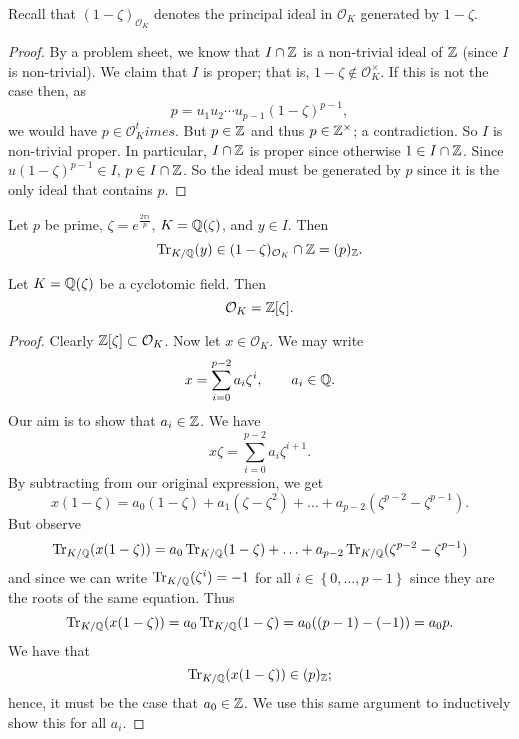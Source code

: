 Recall that $(1 - \zeta)_{\mathcal O_K}$ denotes the principal ideal in 
$\mathcal O_K$ generated by $1 - \zeta$.

\begin{proof}
	By a problem sheet, we know that $I \cap \mathbb{Z}$ is a non-trivial ideal
	of $\mathbb{Z}$ (since $I$ is non-trivial).
	We claim that $I$ is proper;
	that is, $1 - \zeta \not\in \mathcal O_K^\times$.
	If this is not the case then,
	as 
	\[
		p = u_1 u_2 \cdots u_{p-1} \left( 
			1 - \zeta 
		\right)^{p-1},
	\]
	we would have $p \in \mathcal O_K^times$.
	But $p \in \mathbb{Z}$ and thus $p \in \mathbb{Z}^\times$; a contradiction.
	So $I$ is non-trivial proper.
	In particular, $I \cap \mathbb{Z}$ is proper
	since otherwise $1 \in I \cap \mathbb{Z}$.
	Since $u(1 - \zeta)^{p-1} \in I$,
	$p \in I \cap \mathbb{Z}$.
	So the ideal must be generated by $p$ since it is the only ideal
	that contains $p$.
\end{proof}

\begin{theorem}[]
	Let $p$ be prime, $\zeta = e^{\frac{2\pi i}{p}}$,
	$K = \mathbb{Q}(\zeta)$, and $y \in I$.
	Then
	\[
		\operatorname{Tr}_{K/\mathbb{Q}}(y) 
		\in (1-\zeta)_{\mathcal O_K} \cap \mathbb{Z} = (p)_{\mathbb{Z}}.
	\]
\end{theorem}

\begin{theorem}[]
	Let $K = \mathbb{Q}(\zeta)$ be a cyclotomic field. Then
	\[
		\mathcal O_K = \mathbb{Z}[\zeta].
	\]
\end{theorem}

\begin{proof}
	Clearly $\mathbb{Z}[\zeta] \subset \mathcal O_K$.
	Now let $x \in \mathcal O_K$.
	We may write
	\[
		x = \sum_{i=0}^{p-2} a_i \zeta^i, \qquad a_i \in \mathbb{Q}.
	\]
	Our aim is to show that $a_i \in \mathbb{Z}$.
	We have 
	\[
		x \zeta = \sum_{i=0}^{p-2} a_i \zeta^{i+1}.
	\]
	By subtracting from our original expression, we get
	\[
		x(1 - \zeta) 
		= a_0 (1 - \zeta) + a_1 (\zeta - \zeta^2)
		+ \ldots
		+ a_{p-2}(\zeta^{p-2} - \zeta^{p-1}).
	\]
	But observe
	\[
		\operatorname{Tr}_{K/\mathbb{Q}}(x(1-\zeta))
		= a_0 \operatorname{Tr}_{K/\mathbb{Q}}(1 - \zeta)
		+ \ldots + a_{p-2} \operatorname{Tr}_{K/\mathbb{Q}}
			(\zeta^{p-2} - \zeta^{p-1})
	\]
	and since we can write $\operatorname{Tr}_{K/\mathbb{Q}}(\zeta^i) = -1$
	for all $i \in \left\{
		0, \ldots, p-1
	\right\}$ since they are the roots of the same equation.
	Thus
	\[
		\operatorname{Tr}_{K/\mathbb{Q}}(x(1-\zeta))
		= a_0 \operatorname{Tr}_{K/\mathbb{Q}}(1 - \zeta)
		= a_0((p-1)-(-1))
		= a_0p.
	\]
	We have that
	\[
		\operatorname{Tr}_{K/\mathbb{Q}}(x(1-\zeta)) \in (p)_{\mathbb{Z}};
	\]
	hence, it must be the case that $a_0 \in \mathbb{Z}$.
	We use this same argument to inductively show this for all $a_i$.
\end{proof}
